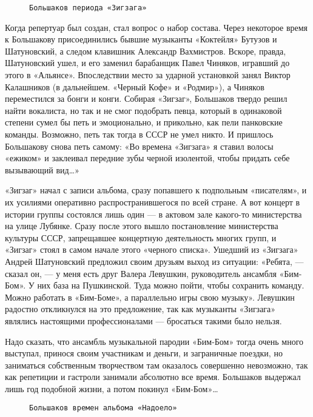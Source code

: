 \begin{wrapfigure}{L}{0.5\textwidth}
    \centering
    \caption{\texttt{Большаков периода «Зигзага»}}
\end{wrapfigure}

Когда репертуар был создан, стал вопрос о набор состава. Через некоторое время к Большакову присоединились бывшие
музыканты «Коктейля» Бутузов и Шатуновский, а следом клавишник Александр Вахмистров. Вскоре, правда, Шатуновский ушел, и
его заменил барабанщик Павел Чиняков, игравший до этого в «Альянсе». Впоследствии место за ударной установкой занял
Виктор Калашников (в дальнейшем. «Черный Кофе» и «Родмир»), а Чиняков переместился за бонги и конги. Собирая «Зигзаг»,
Большаков твердо решил найти вокалиста, но так и не смог подобрать певца, который в одинаковой степени сумел бы петь и
эмоционально, и прикольно, как пели панковские команды. Возможно, петь так тогда в СССР не умел никто. И пришлось
Большакову снова петь самому: «Во времена «Зигзага» я ставил волосы «ежиком» и заклеивал передние зубы черной изолентой,
чтобы придать себе вызывающий вид\ldots»

«Зигзаг» начал с записи альбома, сразу попавшего к подпольным «писателям», и их усилиями оперативно распространившегося
по всей стране. А вот концерт в истории группы состоялся лишь один — в актовом зале какого-то министерства на улице
Лубянке. Сразу после этого вышло постановление министерства культуры СССР, запрещавшее концертную деятельность многих
групп, и «Зигзаг» стоял в самом начале этого «черного списка». Ушедший из «Зигзага» Андрей Шатуновский предложил своим
друзьям выход из ситуации: «Ребята, — сказал он, — у меня есть друг Валера Левушкин, руководитель ансамбля «Бим-Бом». У
них база на Пушкинской. Туда можно пойти, чтобы сохранить команду. Можно работать в «Бим-Боме», а параллельно игры свою
музыку». Левушкин радостно откликнулся на это предложение, так как музыканты «Зигзага» являлись настоящими
профессионалами — бросаться такими было нельзя.

Надо сказать, что ансамбль музыкальной пародии «Бим-Бом» тогда очень много выступал, принося своим участникам и деньги,
и заграничные поездки, но заниматься собственным творчеством там оказалось совершенно невозможно, так как репетиции и
гастроли занимали абсолютно все время. Большаков выдержал лишь год подобной жизни, а потом покинул «Бим-Бом»\ldots

\begin{figure}[h]
    \centering
    \caption{\texttt{Большаков времен альбома «Надоело»}}
\end{figure}

